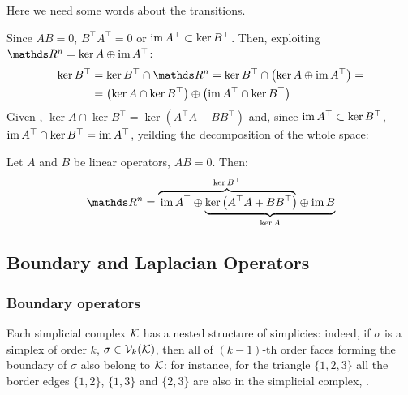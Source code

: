 \begin{tmp}
      Here we need some words about the transitions.
\end{tmp}

Since \( A B = 0\), \( B^\top A^\top = 0 \) or \( \operatorname{im} A^\top \subset \ker B^\top \). Then, exploiting \( \ds R^n = \ker A \oplus \im A^\top \): 
\begin{equation}
      \begin{aligned}
            \ker B^\top & = \ker B^\top \cap \ds R^n = \ker B^\top \cap \left( \ker A \oplus \im A^\top \right) = \\
            & = \left( \ker A \cap \ker B^\top \right) \oplus \left( \im A^\top \cap \ker B^\top \right)
      \end{aligned}
\end{equation}
Given , \( \ker A \cap \ker B^\top = \ker \left(  A^\top A + B B^\top \right) \) and, since \( \operatorname{im} A^\top \subset \ker B^\top \), \( \operatorname{im} A^\top \cap \ker B^\top = \operatorname{im} A^\top \), yeilding the decomposition of  the whole space:
\begin{theorem}\label{thm:hodge_decomposition}
      Let \( A \) and \( B \) be linear operators, \( A B = 0 \). Then:
      \begin{equation}
            \ds R^n = \lefteqn{\overbrace{\phantom{\im A^\top \oplus  \ker \left( A^\top A + B B^\top \right)}}^{\ker B^\top}} \im A^\top \oplus
            \underbrace{\ker \left( A^\top A + B B^\top \right) \oplus  \im B}_{\ker A}
      \end{equation}
      \vspace{-\baselineskip}
\end{theorem}





\subsection{ Boundary and Laplacian Operators }

\subsubsection{Boundary operators}

Each simplicial complex \( \mathcal{K} \) has a nested structure of simplicies: indeed, if \( \sigma \) is a simplex of order \( k \), \( \sigma \in \mathcal{V}_{k}(\mathcal{K}) \), then all of \( (k-1)\)-th order faces forming the boundary of \( \sigma \) also belong to \( \mathcal{K} \): for instance, for the triangle \( \{ 1, 2, 3  \} \) all the border edges \( \{ 1, 2\} \), \( \{ 1, 3\}\) and \( \{ 2, 3 \}\) are also in the simplicial complex, . 


